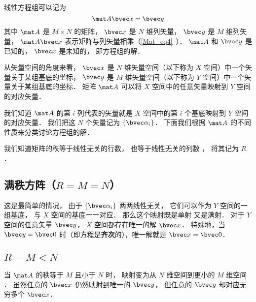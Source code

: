 
\begin{issues}
\issueDraft
{}
\end{issues}


线性方程组可以记为
\begin{equation}\label{LinEq_eq1}
\mat A \bvec x = \bvec y
\end{equation}
其中 $\mat A$ 是 $M \times N$ 的矩阵， $\bvec x$ 是 $N$ 维列矢量， $\bvec y$ 是 $M$ 维列矢量， $\mat A \bvec x$ 表示矩阵与列矢量相乘（\autoref{Mat_eq4}~）． $\mat A$ 和 $\bvec y$ 是已知的， $\bvec x$ 是未知的， 即方程组的解．

从矢量空间的角度来看， $\bvec x$ 是 $N$ 维矢量空间（以下称为 $X$ 空间）中一个矢量关于某组基底的坐标， $\bvec y$ 是 $M$ 维矢量空间（以下称为 $Y$ 空间）中一个矢量关于某组基底的坐标． 矩阵 $\mat A$ 可以将 $X$ 空间中的任意矢量映射到 $Y$ 空间的对应矢量．

我们知道 $\mat A$ 的第 $i$ 列代表的矢量就是 $X$ 空间中的第 $i$ 个基底映射到 $Y$ 空间的对应矢量． 我们把这 $N$ 个矢量记为 $\{\bvec \alpha_i\}$． 下面我们根据 $\mat A$ 的不同性质来分类讨论方程组的解．

我们知道矩阵的秩等于线性无关的行数， 也等于线性无关的列数%
， 将其记为 $R$．

\subsection{满秩方阵（$R = M = N$）}
这是最简单的情况， 由于 $\{\bvec \alpha_i\}$ 两两线性无关， 它们可以作为 $Y$ 空间的一组基底， 与 $X$ 空间的基底一一对应． 那么这个映射既是单射%
又是满射．%
对于 $Y$ 空间的任意矢量 $\bvec y$， $X$ 空间都存在唯一的解 $\bvec x$． 特殊地，当 $\bvec y = \bvec 0$ 时（即方程是\textbf{齐次}的），唯一解就是 $\bvec x = \bvec 0$．

\subsection{$R = M < N$}

当 $\mat A$ 的秩等于 $M$ 且小于 $N$ 时， 映射变为从 $N$ 维空间到更小的 $M$ 维空间 ． 虽然任意的 $\bvec x$ 仍然映射到唯一的 $\bvec y$， 但任意的 $\bvec y$ 却对应无穷多个 $\bvec x$． 

